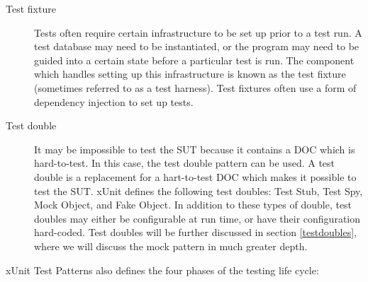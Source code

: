 \begin{description}
\item[Test fixture] Tests often require certain infrastructure to be
  set up prior to a test run. A test database may need to be
  instantiated, or the program may need to be guided into a certain
  state before a particular test is run. The component which handles
  setting up this infrastructure is known as the test fixture
  (sometimes referred to as a test harness). Test fixtures often use
  a form of dependency injection to set up tests.


\item[Test double] It may be impossible to test the SUT because it
  contains a DOC which is hard-to-test. In this case, the test double
  pattern can be used. A test double is a replacement for a
  hart-to-test DOC which makes it possible to test the SUT. xUnit
  defines the following test doubles: Test Stub, Test Spy, Mock
  Object, and Fake Object. In addition to these types of double, test
  doubles may either be configurable at run time, or have their
  configuration hard-coded. Test doubles will be further discussed in
  section \ref{testdoubles}, where we will discuss the mock pattern in
  much greater depth.

\end{description}

xUnit Test Patterns also defines the four phases of the testing life cycle:

